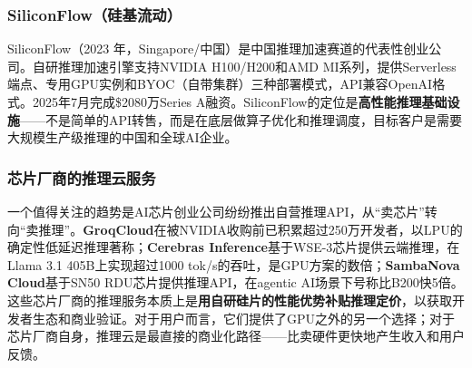 \subsubsection{SiliconFlow（硅基流动）}
SiliconFlow（2023 年，Singapore/中国）是中国推理加速赛道的代表性创业公司。自研推理加速引擎支持NVIDIA H100/H200和AMD MI系列，提供Serverless端点、专用GPU实例和BYOC（自带集群）三种部署模式，API兼容OpenAI格式。2025年7月完成\$2080万Series A融资。SiliconFlow的定位是\textbf{高性能推理基础设施}——不是简单的API转售，而是在底层做算子优化和推理调度，目标客户是需要大规模生产级推理的中国和全球AI企业。

\subsubsection{芯片厂商的推理云服务}
一个值得关注的趋势是AI芯片创业公司纷纷推出自营推理API，从``卖芯片''转向``卖推理''。\textbf{GroqCloud}在被NVIDIA收购前已积累超过250万开发者，以LPU的确定性低延迟推理著称；\textbf{Cerebras Inference}基于WSE-3芯片提供云端推理，在Llama 3.1 405B上实现超过1000 tok/s的吞吐，是GPU方案的数倍；\textbf{SambaNova Cloud}基于SN50 RDU芯片提供推理API，在agentic AI场景下号称比B200快5倍。这些芯片厂商的推理服务本质上是\textbf{用自研硅片的性能优势补贴推理定价}，以获取开发者生态和商业验证。对于用户而言，它们提供了GPU之外的另一个选择；对于芯片厂商自身，推理云是最直接的商业化路径——比卖硬件更快地产生收入和用户反馈。
